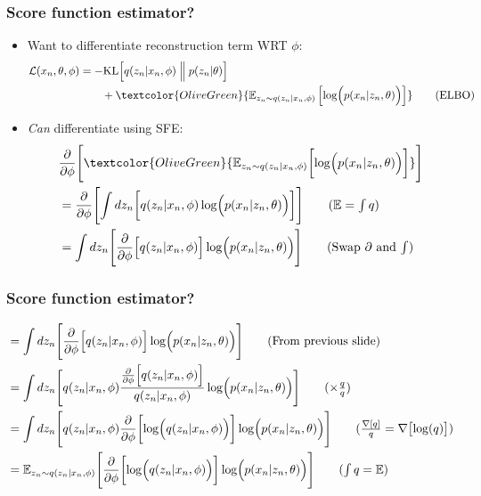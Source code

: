 \documentclass[xcolor=table,dvipsnames]{beamer}
\begin{document}
\begin{frame}[t]
    \frametitle{Score function estimator?}
    \begin{itemize}
        \item Want to differentiate \textcolor{OliveGreen}{reconstruction} term WRT $\phi$:
        \begin{align*}
            \mathcal{L}(x_n, \theta, \phi) &= -\text{KL}\Bigl[q(z_n \vert x_n, \phi) \Bigm\Vert p(z_n \vert \theta)\Bigr] \\
            &\qquad + \textcolor{OliveGreen}{\mathbb{E}_{z_n\sim q(z_n \vert x_n, \phi)}\left[ \log \Bigl(p(x_n \vert z_n, \theta)\Bigr) \right]} \tag{ELBO}
        \end{align*}
        \item \emph{Can} differentiate using SFE:
        \begin{align*}
            &\frac{\partial}{\partial \phi}\Biggl[\textcolor{OliveGreen}{\mathbb{E}_{z_n\sim q(z_n \vert x_n, \phi)}\biggl[ \log \Bigl(p(x_n \vert z_n, \theta)\Bigr) \biggr]}\Biggr] \\
            &= \frac{\partial}{\partial \phi}\Biggl[\int dz_n \biggl[ q(z_n \vert x_n, \phi) \log \Bigl(p(x_n \vert z_n, \theta)\Bigr) \biggr]\Biggr] \tag{$\mathbb{E}=\int q$} \\
            &= \int dz_n \Biggl[ \frac{\partial}{\partial \phi}\Bigl[q(z_n \vert x_n, \phi)\Bigr] \log \Bigl(p(x_n \vert z_n, \theta)\Bigr) \Biggr] \tag{Swap $\partial$ and $\int$}
        \end{align*}
    \end{itemize}
\end{frame}

\begin{frame}[t]
    \frametitle{Score function estimator?}
    \begin{align*}
        &= \int dz_n \Biggl[ \frac{\partial}{\partial \phi}\Bigl[q(z_n \vert x_n, \phi)\Bigr] \log \Bigl(p(x_n \vert z_n, \theta)\Bigr) \Biggr] \tag{From previous slide} \\
        &= \int dz_n \Biggl[ q(z_n \vert x_n, \phi) \frac{\frac{\partial}{\partial \phi}\Bigl[q(z_n \vert x_n, \phi)\Bigr]}{q(z_n \vert x_n, \phi)} \log \Bigl(p(x_n \vert z_n, \theta)\Bigr) \Biggr] \tag{$\times\frac{q}{q}$} \\
        &= \int dz_n \Biggl[ q(z_n \vert x_n, \phi) \frac{\partial}{\partial \phi}\biggl[\log \Bigl(q(z_n \vert x_n, \phi)\Bigr)\biggr] \log \Bigl(p(x_n \vert z_n, \theta)\Bigr) \Biggr] \tag{$\frac{\nabla[q]}{q}=\nabla\bigl[\log(q)\bigr]$} \\
        &= \mathbb{E}_{z_n\sim q(z_n \vert x_n, \phi)} \Biggl[ \frac{\partial}{\partial \phi}\biggl[\log \Bigl(q(z_n \vert x_n, \phi)\Bigr)\biggr] \log \Bigl(p(x_n \vert z_n, \theta)\Bigr) \Biggr] \tag{$\int q=\mathbb{E}$} \\
    \end{align*}
\end{frame}
\end{document}
